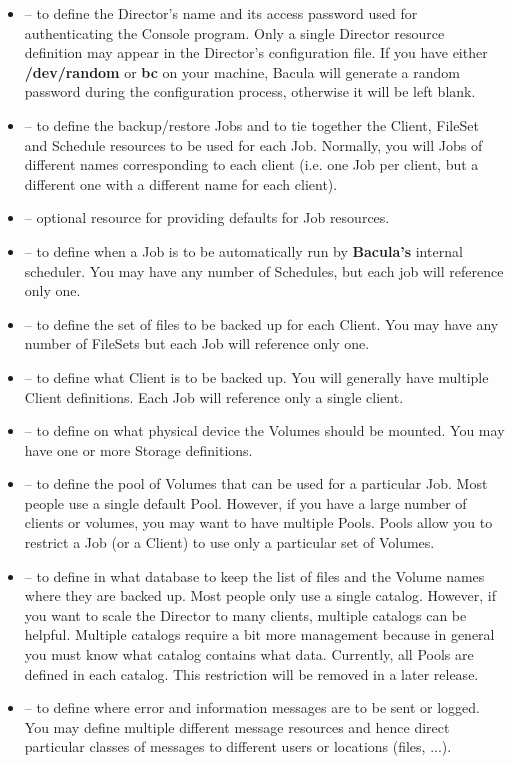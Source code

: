 \begin{itemize}
\item 
    -- to  define the Director's
   name and its access password used for authenticating the Console program.
   Only a single  Director resource definition may appear in the Director's 
   configuration file.  If you have either {\bf /dev/random} or  {\bf bc} on your
   machine, Bacula will generate a random password during the configuration
   process, otherwise it will  be left blank. 
\item 
    -- to define the backup/restore Jobs 
   and to tie together the Client, FileSet and Schedule resources to  be used
   for each Job. Normally, you will Jobs of different names corresponding
   to each client (i.e. one Job per client, but a different one with a different name
   for each client).
\item 
    -- optional resource for 
   providing defaults for Job resources.  
\item 
    -- to define when a Job is to 
   be automatically run by {\bf Bacula's} internal scheduler. You 
   may have any number of Schedules, but each job will reference only
   one.
\item 
    -- to define the set of files 
   to be backed up for each Client. You may have any number of
   FileSets but each Job will reference only one.
\item 
    -- to define what Client is to be
   backed up. You will generally have multiple Client definitions. Each 
   Job will reference only a single client.
\item 
    -- to define on what physical
   device the Volumes should be mounted. You may have one or
   more Storage definitions.
\item 
    -- to define the pool of Volumes
   that can be used for a particular Job. Most people use a
   single default Pool.  However, if you have a large number
   of clients or volumes, you may want to have multiple Pools.
   Pools allow you to restrict a Job (or a Client) to use
   only a particular set of Volumes.
\item 
    -- to define in what database to
   keep the list of files and the Volume names where they are backed up.  
   Most people only use a single catalog.  However, if you want to
   scale the Director to many clients, multiple catalogs can be helpful.
   Multiple catalogs require a bit more management because in general
   you must know what catalog contains what data.  Currently, all 
   Pools are defined in each catalog.  This restriction will be removed
   in a later release.
\item 
    -- to define where error and
   information messages are to be sent or logged. You may define
   multiple different message resources and hence direct particular
   classes of messages to different users or locations (files, ...).
\end{itemize}

